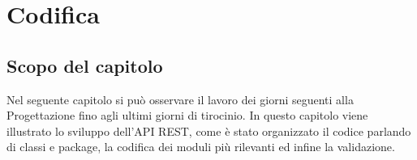 \chapter{Codifica}
\label{cap:codifica}

\section{Scopo del capitolo}
Nel seguente capitolo si può osservare il lavoro dei giorni seguenti alla Progettazione fino agli ultimi giorni di tirocinio. In questo capitolo viene illustrato lo sviluppo dell'API REST, come è stato organizzato il codice parlando di classi e package, la codifica dei moduli più rilevanti ed infine la validazione. \\












